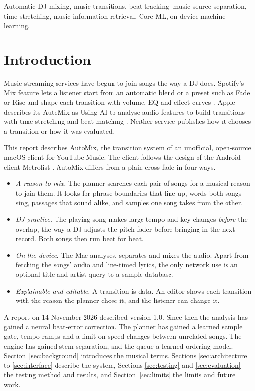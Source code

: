 \documentclass[conference,a4paper]{IEEEtran}
\newcommand{\q}[1]{\textquotedbl{}#1\textquotedbl{}}
\begin{document}
\begin{IEEEkeywords}
Automatic DJ mixing, music transitions, beat tracking, music source separation, time-stretching,
music information retrieval, Core ML, on-device machine learning.
\end{IEEEkeywords}

\section{Introduction}

Music streaming services have begun to join songs the way a DJ does. Spotify's Mix feature lets a
listener start from an automatic blend or a preset such as \q{Fade} or \q{Rise} and shape each
transition with volume, EQ and effect curves \cite{spotifymix}. Apple describes its AutoMix as
\q{Using AI to analyse audio features} to build transitions \q{with time stretching and beat
matching} \cite{applemix}. Neither service publishes how it chooses a transition or how it was
evaluated.

This report describes AutoMix, the transition system of an unofficial, open-source macOS client
for YouTube Music. The client follows the design of the Android client Metrolist
\cite{metrolist}. AutoMix differs from a plain cross-fade in four ways.
\begin{itemize}
\item \emph{A reason to mix.} The planner searches each pair of songs for a musical reason to join
them. It looks for phrase boundaries that line up, words both songs sing, passages that sound
alike, and samples one song takes from the other.
\item \emph{DJ practice.} The playing song makes large tempo and key changes \emph{before} the
overlap, the way a DJ adjusts the pitch fader before bringing in the next record. Both songs then
run beat for beat.
\item \emph{On the device.} The Mac analyses, separates and mixes the audio. Apart from fetching
the songs' audio and line-timed lyrics, the only network use is an optional title-and-artist query
to a sample database.
\item \emph{Explainable and editable.} A transition is data. An editor shows each transition with
the reason the planner chose it, and the listener can change it.
\end{itemize}

A report on 14 November 2026 described version 1.0. Since then the analysis has gained a
neural beat-error correction. The planner has gained a learned sample gate, tempo ramps and a limit
on speed changes between unrelated songs. The engine has gained stem separation, and the queue a
learned ordering model. Section~\ref{sec:background} introduces the musical terms. Sections
\ref{sec:architecture} to \ref{sec:interface} describe the system, Sections \ref{sec:testing} and
\ref{sec:evaluation} the testing method and results, and Section~\ref{sec:limits} the limits and
future work.
\end{document}
